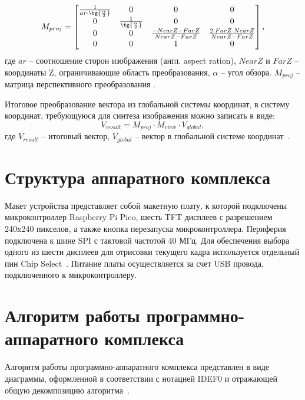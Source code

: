 \begin{equation}
M_{proj} = 
\begin{bmatrix}
    \frac{1}{ar \cdot \tg{\frac{\alpha}{2}}} & 0 & 0 & 0 \\
    0 & \frac{1}{\tg{\frac{\alpha}{2}}} & 0 & 0 \\
    0 & 0 & \frac{-NearZ-FarZ}{NearZ-FarZ} & \frac{2 \cdot FarZ \cdot NearZ}{NearZ-FarZ} \\
    0   &  0  &  1  & 0 \\  
\end{bmatrix},
\end{equation}
где $ar$ -- соотношение сторон изображения (англ. aspect ration), $NearZ$ и $FarZ$ -- координаты Z, ограничивающие область преобразования, $\alpha$ -- угол обзора. $M_{proj}$ -- матрица перспективного преобразования \cite{perspective}. 

Итоговое преобразование вектора из глобальной системы координат, в систему координат, требующуюся для синтеза изображения можно записать в виде:
\begin{equation}
V_{result} = M_{proj} \cdot M_{view} \cdot V_{global},
\end{equation}
где $V_{result}$ -- итоговый вектор, $V_{global}$ -- вектор в глобальной системе координат~\cite{projection}.

\section{Структура аппаратного комплекса}
Макет устройства представляет собой макетную плату, к которой подключены микроконтроллер Raspberry Pi Pico, шесть TFT дисплеев с разрешением 240x240 пикселов, а также кнопка перезапуска микроконтроллера. Периферия подключена к шине SPI с тактовой частотой 40 МГц. Для обеспечения выбора одного из шести дисплеев для отрисовки текущего кадра используется отдельный пин Chip Select~\cite{cs}. Питание платы осуществляется за счет USB провода, подключенного к микроконтроллеру. 

\section{Алгоритм работы программно-аппаратного комплекса}

Алгоритм работы программно-аппаратного комплекса представлен в виде диаграммы, оформленной в
соответствии с нотацией IDEF0 и отражающей общую декомпозицию
алгоритма~\cite{idef0}.

